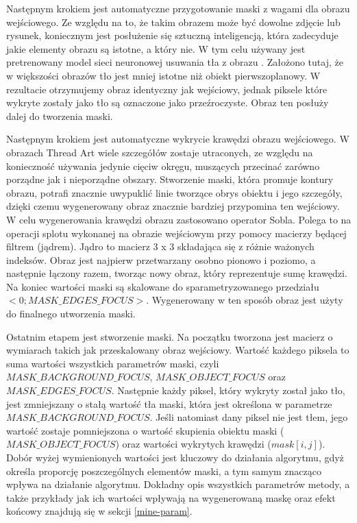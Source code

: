     Następnym krokiem jest automatyczne przygotowanie maski z wagami dla obrazu wejściowego. Ze względu na to, że takim obrazem może być dowolne zdjęcie lub rysunek, koniecznym jest posłużenie się sztuczną inteligencją, która zadecyduje jakie elementy obrazu są istotne, a który nie. W tym celu używany jest pretrenowany model sieci neuronowej usuwania tła z obrazu \cite{rembg}. Założono tutaj, że w większości obrazów tło jest mniej istotne niż obiekt pierwszoplanowy. W rezultacie otrzymujemy obraz identyczny jak wejściowy, jednak piksele które wykryte zostały jako tło są oznaczone jako przeźroczyste. Obraz ten posłuży dalej do tworzenia maski.
    
    Następnym krokiem jest automatyczne wykrycie krawędzi obrazu wejściowego. W obrazach Thread Art wiele szczegółów zostaje utraconych, ze względu na konieczność używania jedynie cięciw okręgu, muszących przecinać zarówno porządne jak i nieporządne obszary. Stworzenie maski, która promuje kontury obrazu, potrafi znacznie uwypuklić linie tworzące obrys obiektu i jego szczegóły, dzięki czemu wygenerowany obraz znacznie bardziej przypomina ten wejściowy. W celu wygenerowania krawędzi obrazu zastosowano operator Sobla. Polega to na operacji splotu wykonanej na obrazie wejściowym przy pomocy macierzy będącej filtrem (jądrem). Jądro to macierz 3 x 3 składająca się z różnie ważonych indeksów. Obraz jest najpierw przetwarzany osobno pionowo i poziomo, a następnie łączony razem, tworząc nowy obraz, który reprezentuje sumę krawędzi. Na koniec wartości maski są skalowane do sparametryzowanego przedziału \(<0;MASK\_EDGES\_FOCUS>\). Wygenerowany w ten sposób obraz jest użyty do finalnego utworzenia maski.
    
    Ostatnim etapem jest stworzenie maski. Na początku tworzona jest macierz o wymiarach takich jak przeskalowany obraz wejściowy. Wartość każdego piksela to suma wartości wszystkich parametrów maski, czyli \(MASK\_BACKGROUND\_FOCUS\), \(MASK\_OBJECT\_FOCUS\) oraz \(MASK\_EDGES\_FOCUS\). Następnie każdy piksel, który wykryty został jako tło, jest zmniejszany o stałą wartość tła maski, która jest określona w parametrze \(MASK\_BACKGROUND\_FOCUS\). Jeśli natomiast dany piksel nie jest tłem, jego wartość zostaje pomniejszona o wartość skupienia obiektu maski (\(MASK\_OBJECT\_FOCUS\)) oraz wartości wykrytych krawędzi (\(mask[i, j]\)). Dobór wyżej wymienionych wartości jest kluczowy do działania algorytmu, gdyż określa proporcję poszczególnych elementów maski, a tym samym znacząco wpływa na działanie algorytmu. Dokładny opis wszystkich parametrów metody, a także przykłady jak ich wartości wpływają na wygenerowaną maskę oraz efekt końcowy znajdują się w sekcji \ref{mine-param}. 
    
